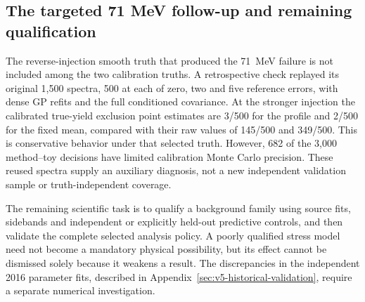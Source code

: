 \subsection{The targeted 71 MeV follow-up and remaining qualification}
The reverse-injection smooth truth that produced the 71~MeV failure is
not included among the two calibration truths. A retrospective check
replayed its original 1,500 spectra, 500 at each of zero, two and five
reference errors, with dense GP refits and the full conditioned covariance.
At the stronger injection the calibrated true-yield exclusion point
estimates are 3/500 for the profile and 2/500 for the fixed mean, compared
with their raw values of 145/500 and 349/500. This is conservative behavior
under that selected truth. However, 682 of the 3,000 method--toy decisions
have limited calibration Monte Carlo precision. These reused spectra
supply an auxiliary diagnosis, not a new independent validation sample
or truth-independent coverage.

The remaining scientific task is to qualify a background family using
source fits, sidebands and independent or explicitly held-out predictive
controls, and then validate the complete selected analysis policy. A
poorly qualified stress model need not become a mandatory physical
possibility, but its effect cannot be dismissed solely because it weakens
a result. The discrepancies in the independent 2016 parameter fits,
described in Appendix~\ref{sec:v5-historical-validation}, require a separate
numerical investigation.
